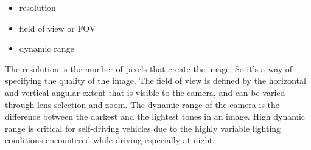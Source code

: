 \begin{itemize}
\item resolution
\item field of view or FOV
\item dynamic range
\end{itemize}

The resolution is the number of pixels that create the image. So it's a way of specifying
the quality of the image.  The field of view is defined by the horizontal and vertical angular extent that is visible to the camera, and can be
varied through lens selection and zoom. The dynamic range of the camera is the difference between the darkest and the lightest tones in an image. High dynamic range is critical for
self-driving vehicles due to the highly variable lighting conditions encountered
while driving especially at night. 

